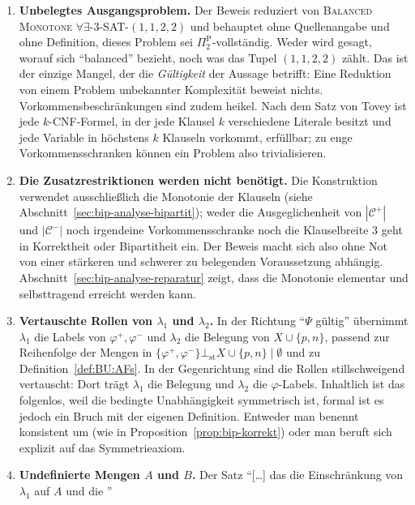 \begin{enumerate}
    \item \textbf{Unbelegtes Ausgangsproblem.} Der Beweis reduziert von
    \textsc{Balanced Monotone \(\forall\exists\)-3-SAT-\((1,1,2,2)\)} und
    behauptet ohne Quellenangabe und ohne Definition, dieses Problem sei
    \(\Pi_2^\text{P}\)-vollständig. Weder wird gesagt, worauf sich
    \enquote{balanced} bezieht, noch was das Tupel \((1,1,2,2)\) zählt. Das ist
    der einzige Mangel, der die \emph{Gültigkeit} der Aussage betrifft: Eine
    Reduktion von einem Problem unbekannter Komplexität beweist nichts.
    Vorkommensbeschränkungen sind zudem heikel. Nach dem Satz von Tovey ist
    jede \(k\)-CNF-Formel, in der jede Klausel \(k\) verschiedene Literale
    besitzt und jede Variable in höchstens \(k\) Klauseln vorkommt, erfüllbar;
    zu enge Vorkommensschranken können ein Problem also trivialisieren.
    \item \textbf{Die Zusatzrestriktionen werden nicht benötigt.} Die
    Konstruktion verwendet ausschließlich die Monotonie der Klauseln (siehe
    Abschnitt~\ref{sec:bip-analyse-bipartit}); weder die Ausgeglichenheit von
    \(|\mathcal{C}^{+}|\) und \(|\mathcal{C}^{-}|\) noch irgendeine
    Vorkommensschranke noch die Klauselbreite \(3\) geht in Korrektheit oder
    Bipartitheit ein. Der Beweis macht sich also ohne Not von einer stärkeren
    und schwerer zu belegenden Voraussetzung abhängig.
    Abschnitt~\ref{sec:bip-analyse-reparatur} zeigt, dass die Monotonie
    elementar und selbsttragend erreicht werden kann.
    \item \textbf{Vertauschte Rollen von \(\lambda_1\) und \(\lambda_2\).} In
    der Richtung \enquote{\(\Psi\) gültig} übernimmt \(\lambda_1\) die Labels
    von \(\varphi^{+},\varphi^{-}\) und \(\lambda_2\) die Belegung von
    \(X\cup\{p,n\}\), passend zur Reihenfolge der Mengen in
    \(\{\varphi^{+},\varphi^{-}\}\bot_{\mathrm{st}}X\cup\{p,n\}\mid\emptyset\)
    und zu Definition~\ref{def:BU:AFs}. In der Gegenrichtung sind die Rollen
    stillschweigend vertauscht: Dort trägt \(\lambda_1\) die Belegung und
    \(\lambda_2\) die \(\varphi\)-Labels. Inhaltlich ist das folgenlos, weil
    die bedingte Unabhängigkeit symmetrisch ist, formal ist es jedoch ein
    Bruch mit der eigenen Definition. Entweder man benennt konsistent um (wie
    in Proposition~\ref{prop:bip-korrekt}) oder man beruft sich explizit auf
    das Symmetrieaxiom.
    \item \textbf{Undefinierte Mengen \(A\) und \(B\).} Der Satz
    \enquote{[\ldots] das die Einschränkung von \(\lambda_1\) auf \(A\) und die
}
\end{enumerate}
